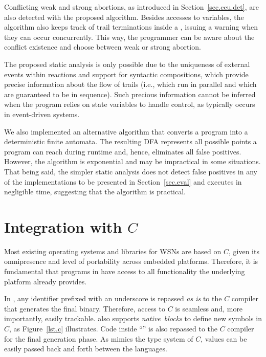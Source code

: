 Conflicting weak and strong abortions, as introduced in 
Section~\ref{sec.ceu.det}, are also detected with the proposed algorithm.
Besides accesses to variables, the algorithm also keeps track of trail 
terminations inside a , issuing a warning when they can occur 
concurrently.
This way, the programmer can be aware about the conflict existence and choose
between weak or strong abortion.

The proposed static analysis is only possible due to the uniqueness of external 
events within reactions and support for syntactic compositions, which provide 
precise information about the flow of trails (i.e., which run in parallel and 
which are guaranteed to be in sequence).
Such precious information cannot be inferred when the program relies on state 
variables to handle control, as typically occurs in event-driven systems.

We also implemented an alternative algorithm that converts a \CEU program into 
a deterministic finite automata.
The resulting DFA represents all possible points a program can reach during 
runtime and, hence, eliminates all false positives.
However, the algorithm is exponential and may be impractical in some 
situations.
%
That being said, the simpler static analysis does not detect false positives in 
any of the
implementations to be presented in Section~\ref{sec.eval} and executes in 
negligible time, suggesting that the algorithm is practical.

\section{Integration with $C$}
\label{sec.ceu.c}

Most existing operating systems and libraries for WSNs are based on $C$, given 
its omnipresence and level of portability across embedded platforms.
Therefore, it is fundamental that programs in \CEU have access to all 
functionality the underlying platform already provides.

In \CEU, any identifier prefixed with an underscore is repassed \emph{as is} to 
the $C$ compiler that generates the final binary.
Therefore, access to $C$ is seamless and, more importantly, easily trackable.
%
\CEU also supports \emph{native~blocks} to define new symbols in $C$, as 
Figure~\ref{lst.c} illustrates.
Code inside ``'' is also repassed to the $C$ compiler 
for the final generation phase.
As \CEU{} mimics the type system of $C$, values can be easily passed back and 
forth between the languages.

